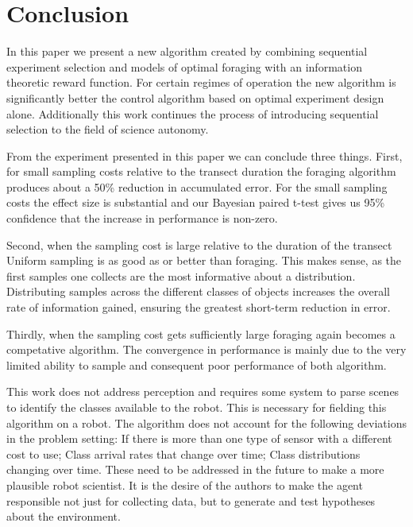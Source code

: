 \section{Conclusion}
\label{sec:conclusion}

In this paper we present a new algorithm created by combining sequential experiment selection and models of optimal foraging with an information theoretic reward function.  For certain regimes of operation the new algorithm is significantly better the control algorithm based on optimal experiment design alone.  Additionally this work continues the process of introducing sequential selection to the field of science autonomy.  

From the experiment presented in this paper we can conclude three things.  First, for small sampling costs relative to the transect duration the foraging algorithm produces about a 50\% reduction in accumulated error.  For the small sampling costs the effect size is substantial and our Bayesian paired t-test gives us 95\% confidence that the increase in performance is non-zero.

Second, when the sampling cost is large relative to the duration of the transect Uniform sampling is as good as or better than foraging.  This makes sense, as the first samples one collects are the most informative about a distribution.  Distributing samples across the different classes of objects increases the overall rate of information gained, ensuring the greatest short-term reduction in error.

Thirdly, when the sampling cost gets sufficiently large foraging again becomes a competative algorithm.  The convergence in performance is mainly due to the very limited ability to sample and consequent poor performance of both algorithm.  

This work does not address perception and requires some system to parse scenes to identify the classes available to the robot.  This is necessary for fielding this algorithm on a robot.  The algorithm does not account for the following deviations in the problem setting: If there is more than one type of sensor with a different cost to use; Class arrival rates that change over time; Class distributions changing over time.  These need to be addressed in the future to make a more plausible robot scientist.  It is the desire of the authors to make the agent responsible not just for collecting data, but to generate and test hypotheses about the environment.
% 
% 
% 
% 
% 




